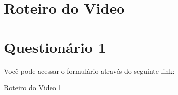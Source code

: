 \chapter{Roteiro do Video}


\chapter{Questionário 1}
\label{chap:roteiro1}

Você pode acessar o formulário através do seguinte link:

\begin{center}
  \href{https://www.youtube.com/watch?v=H80poFoIqsw}
       {Roteiro do Video 1}
\end{center}

